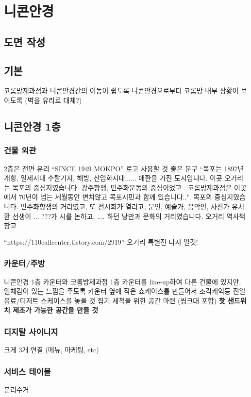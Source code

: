 \documentclass{myproc}
\begin{document}
\section{니콘안경}
\subsection{도면 작성}
\subsection{기본}
\bit
\w 코롬방제과점과 니콘안경간의 이동이 쉽도록
\w 니콘안경으로부터 코롬방 내부 상황이 보이도록 (벽을 유리로 대체?)
\eit

\subsection{니콘안경 1층}
\subsubsection{건물 외관}
\bit
\w 2층은 전면 유리
\w ``SINCE 1949 MOKPO'' 로고 사용할 것
\w 좋은 문구 ``목포는 1897년 개항, 일제시대 수탈기지, 해방, 산업화시대...... 애환을 가진
도시입니다.  이곳 오거리는 목포의 중심지였습니다. 광주항쟁, 민주화운동의
중심이었고 . 코롬방제과점은 이곳에서 70년이 넘는 세월동안 변치않고 목포시민과
함께 있습니다..". 목포의 중심지였습니다. 민주화항쟁의 거리였고, 또 전시회가
열리고, 문인, 예술가, 음악인, 사진가 유치환 선생이 ... ???가 시를 논하고, .... 하던 낭만과 문화의
거리였습니다.
\w 오거리 역사책 참고

\w ``https://110callcenter.tistory.com/2919''
\w 오거리 특별전 다시 열것!
\eit

\subsubsection{카운터/주방}
\bit
\w 니콘안경 1층 카운터와 코롬방제과점 1층 카운터를 line-up하여 다른 건물에
있지만, 일체감이 있는 느낌을 주도록
\w 카운터 옆에 작은 쇼케이스를 만들어서 조각케익등 진열
\w 음료/디저트  쇼케이스를 놓을 것
\w 집기 세척을 위한 공간 마련 (씽크대 포함)
\w \textcolor{red2}{\bf 핫 샌드위치 제조가 가능한 공간을 만들 것}
\eit


\subsubsection{디지탈 사이니지}
\bit
\w 크게 3개 연결  (메뉴, 마케팅, etc)
\eit

\subsubsection{서비스 테이블}
\bit
\w 분리수거 
\eit
\end{document}
